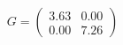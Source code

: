 \documentclass[preview]{standalone}
\begin{document}
\begin{align*}
G = \begin{pmatrix} 3.63 & 0.00 \\ 0.00 & 7.26 \end{pmatrix}
\end{align*}
\end{document}
